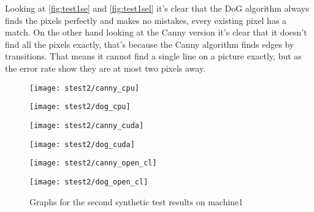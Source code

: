 Looking at \autoref{fig:test1se} and \autoref{fig:test1sel} it's clear that the \ac{DoG} algorithm always finds the pixels perfectly and makes no mistakes, every existing pixel has a match. On the other hand looking at the \ac{Canny} version it's clear that it doesn't find all the pixels exactly, that's because the \ac{Canny} algorithm finds edges by transitions. That means it cannot find a single line on a picture exactly, but as the error rate show they are at most two pixels away.

\clearpage

\begin{figure}[H]
\centering
\begin{minipage}[t]{.49\textwidth}
\centering
\texttt{[image: stest2/canny\_cpu]}
\end{minipage}
\begin{minipage}[t]{.49\textwidth}
\centering
\texttt{[image: stest2/dog\_cpu]}
\end{minipage}
\begin{minipage}[t]{.49\textwidth}
\centering
\texttt{[image: stest2/canny\_cuda]}
\end{minipage}
\begin{minipage}[t]{.49\textwidth}
\centering
\texttt{[image: stest2/dog\_cuda]}
\end{minipage}
\begin{minipage}[t]{.49\textwidth}
\centering
\texttt{[image: stest2/canny\_open\_cl]}
\end{minipage}
\begin{minipage}[t]{.49\textwidth}
\centering
\texttt{[image: stest2/dog\_open\_cl]}
\end{minipage}
\caption{Graphs for the second synthetic test results on machine1}
\label{fig:test2s}
\end{figure}

